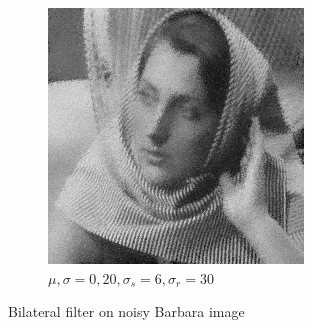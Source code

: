 \documentclass[a4paper, landscape]{article}
\begin{document}
\begin{figure}
\begin{subfigure}{0.48\linewidth}
        \includegraphics[width=\linewidth]{barbara256,σ_noise20,σ_spatial6,σ_range30.png}
        \caption{$\mu, \sigma = 0, 20, \sigma_s=6, \sigma_r=30$}
    \end{subfigure}
    \caption{Bilateral filter on noisy Barbara image}
    \label{fig:bn}
\end{figure}
\end{document}
